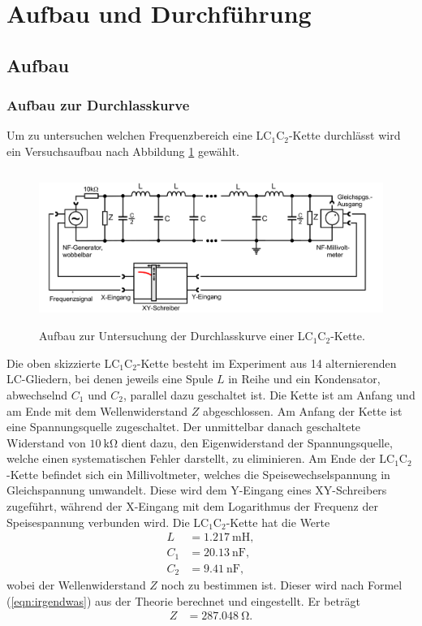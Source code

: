 \section{Aufbau und Durchführung}
\label{sec:Durchführung}
\subsection{Aufbau}
\label{sec:Aufbau}
\subsubsection{Aufbau zur Durchlasskurve}Um zu untersuchen welchen Frequenzbereich eine LC$_1$C$_2$-Kette durchlässt wird ein Versuchsaufbau nach Abbildung \ref{dfig:1} gewählt.

\begin{figure}[H]
  \centering
  \includegraphics[height=5cm]{durchlass.png}
  \caption{Aufbau zur Untersuchung der Durchlasskurve einer LC$_1$C$_2$-Kette. \cite{sample}}
  \label{dfig:1}
\end{figure}

Die oben skizzierte LC$_1$C$_2$-Kette besteht im Experiment aus 14 alternierenden LC-Gliedern, bei denen jeweils eine Spule $L$ in Reihe und ein Kondensator, abwechselnd $C_1$ und $C_2$, parallel dazu geschaltet ist.
Die Kette ist am Anfang und am Ende mit dem Wellenwiderstand $Z$ abgeschlossen.
Am Anfang der Kette ist eine Spannungsquelle zugeschaltet.
Der unmittelbar danach geschaltete Widerstand von $\SI{10}{\kilo\ohm}$ dient dazu, den Eigenwiderstand der Spannungsquelle, welche einen systematischen Fehler darstellt, zu eliminieren.
Am Ende der LC$_1$C$_2$-Kette befindet sich ein Millivoltmeter, welches die Speisewechselspannung in Gleichspannung umwandelt.
Diese wird dem Y-Eingang eines XY-Schreibers zugeführt, während der X-Eingang mit dem Logarithmus der Frequenz der Speisespannung verbunden wird.
Die LC$_1$C$_2$-Kette hat die Werte
\begin{align*}
  L   &= \SI{1,217}{\milli\henry},\\
  C_1 &= \SI{20,13}{\nano\farad},\\
  C_2 &= \SI{9,41}{\nano\farad},
\end{align*}
wobei der Wellenwiderstand $Z$ noch zu bestimmen ist.
Dieser wird nach Formel (\ref{eqn:irgendwas}) aus der Theorie berechnet und eingestellt.
Er beträgt
\begin{align*}
  Z   &= \SI{287.048}{\ohm}.
\end{align*}

